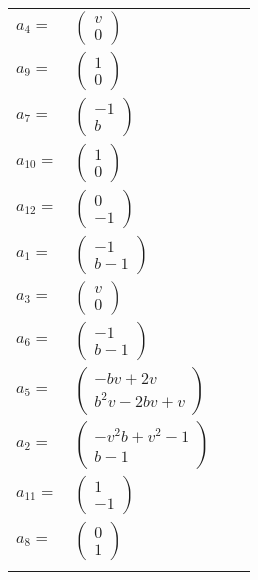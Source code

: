 \documentclass[1p]{elsarticle_modified}
\theoremstyle{definition}
\begin{document}
\begin{tabular}{m{7pt} m{180pt} m{7pt} m{180pt} }
\flushright $a_{4}=$&$\begin{pmatrix}v\\0\end{pmatrix}$ \\
\flushright $a_{9}=$&$\begin{pmatrix}1\\0\end{pmatrix}$ \\
\flushright $a_{7}=$&$\begin{pmatrix}-1\\b\end{pmatrix}$ \\
\flushright $a_{10}=$&$\begin{pmatrix}1\\0\end{pmatrix}$ \\
\flushright $a_{12}=$&$\begin{pmatrix}0\\-1\end{pmatrix}$ \\
\flushright $a_{1}=$&$\begin{pmatrix}-1\\b-1\end{pmatrix}$ \\
\flushright $a_{3}=$&$\begin{pmatrix}v\\0\end{pmatrix}$ \\
\flushright $a_{6}=$&$\begin{pmatrix}-1\\b-1\end{pmatrix}$ \\
\flushright $a_{5}=$&$\begin{pmatrix}- b v+2 v\\b^2 v-2 b v+v\end{pmatrix}$ \\
\flushright $a_{2}=$&$\begin{pmatrix}- v^2 b+v^2-1\\b-1\end{pmatrix}$ \\
\flushright $a_{11}=$&$\begin{pmatrix}1\\-1\end{pmatrix}$ \\
\flushright $a_{8}=$&$\begin{pmatrix}0\\1\end{pmatrix}$\\&\end{tabular}
\end{document}
